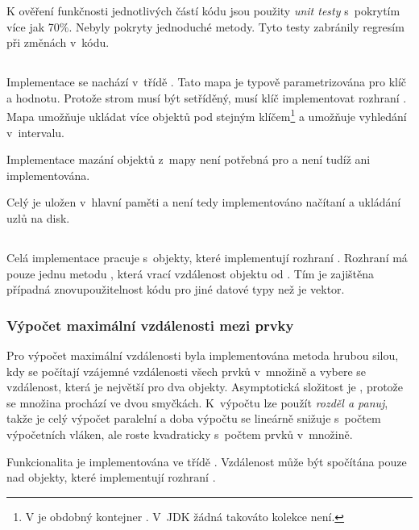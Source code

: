 K ověření funkčnosti jednotlivých částí kódu jsou použity \emph{unit testy} s~pokrytím více jak 70$\%$.
Nebyly pokryty jednoduché metody.
Tyto testy zabránily regresím při změnách v~kódu.

\subsection{\BPTree}
Implementace \BPTree{} se nachází v~třídě \linebreak {}. Tato mapa je typově parametrizována pro klíč a hodnotu. Protože strom musí být setříděný, musí klíč implementovat rozhraní . Mapa umožňuje ukládat více objektů pod stejným klíčem\footnote{V \CC{} je obdobný kontejner \cite{ISO:2012:CPP}. V~JDK žádná takováto kolekce není.} a umožňuje vyhledání v~intervalu.

Implementace mazání objektů z~mapy není potřebná pro \MIndex{} a není tudíž ani implementována.

Celý \BPTree{} je uložen v~hlavní paměti a není tedy implementováno načítaní a ukládání uzlů na disk.

\subsection{\MIndex{}}
Celá implementace \MIndex{} pracuje s~objekty, které implementují rozhraní .
Rozhraní  má pouze jednu metodu , která vrací vzdálenost objektu od .
Tím je zajištěna případná znovupoužitelnost kódu pro jiné datové typy než je vektor.

\subsubsection{Výpočet maximální vzdálenosti mezi prvky}
Pro výpočet maximální vzdálenosti byla implementována metoda hrubou silou, kdy se počítají vzájemné vzdálenosti všech prvků v~množině a vybere se vzdálenost, která je největší pro dva objekty.
Asymptotická složitost je , protože se množina prochází ve dvou smyčkách.
K~výpočtu lze použít \emph{rozděl a panuj}, takže je celý výpočet paralelní a doba výpočtu se lineárně snižuje s~počtem výpočetních vláken, ale roste kvadraticky s~počtem prvků v~množině.

Funkcionalita je implementována ve třídě \linebreak {}.
Vzdálenost může být spočítána pouze nad objekty, které implementují rozhraní .

